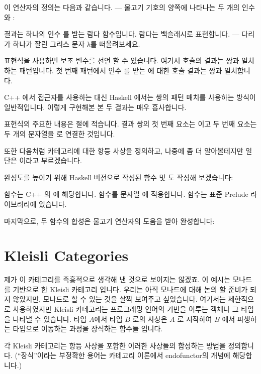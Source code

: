 이 연산자의 정의는 다음과 같습니다. --- 물고기 기호의 양쪽에 나타나는 두 개의 인수
와 :

결과는 하나의 인수 를 받는 람다 함수입니다. 람다는 백슬래시로 표현합니다. ---
다리가 하나가 잘린 그리스 문자 λ를 떠올려보세요.

 표현식을 사용하면 보조 변수를 선언 할 수 있습니다. 여기서 
호출의 결과는  쌍과 일치하는 패턴입니다. 첫 번째 패턴에서 인수
를 받는 에 대한 호출 결과는  쌍과 일치합니다.

C++ 에서 접근자를 사용하는 대신 Haskell 에서는 쌍의 패턴 매치를 사용하는 방식이
일반적입니다. 이렇게 구현해본 본 두 결과는 매우 흡사합니다.

 표현식의 주요한 내용은  절에 적습니다.
결과 쌍의 첫 번째 요소는 이고 두 번째 요소는 두 개의 문자열을
 로 연결한 것입니다.

또한 다음처럼 카테고리에 대한 항등 사상을 정의하고, 나중에 좀 더 알아볼테지만 일단은
이라고 부르겠습니다.

완성도를 높이기 위해 Haskell 버전으로 작성된 함수  및
도 작성해 보겠습니다:

 함수는 C++ 의 에 해당합니다. 
함수를 문자열 에 적용합니다.  함수는 표준 Prelude 라이브러리에
있습니다.

마지막으로, 두 함수의 합성은 물고기 연산자의 도움을 받아 완성합니다:


\section{Kleisli Categories}

제가 이 카테고리를 즉흥적으로 생각해 낸 것으로 보이지는 않겠죠. 이 예시는 모나드를
기반으로 한 Kleisli 카테고리 입니다. 우리는 아직 모나드에 대해 논의 할 준비가 되지
않았지만, 모나드로 할 수 있는 것을 살짝 보여주고 싶었습니다. 여기서는 제한적으로
사용하였지만 Kleisli 카테고리는 프로그래밍 언어의 기반을 이루는 객체나 그 타입을 나타낼
수 있습니다. 타입 $A$에서 타입 $B$ 로의 사상은 $A$ 로 시작하여 $B$ 에서 파생하는
타입으로 이동하는 과정을 장식하는 함수들 입니다.

각 Kleisli 카테고리는 항등 사상을 포함한 이러한 사상들의 합성하는 방법을 정의합니다.
(``장식''이라는 부정확한 용어는 카테고리 이론에서 endofunctor의 개념에 해당합니다.)

